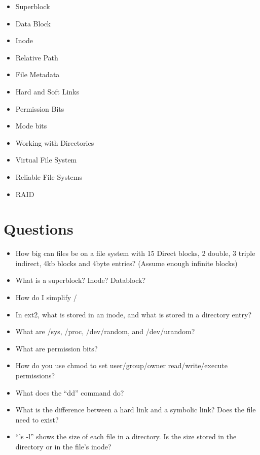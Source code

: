 \begin{itemize}
\tightlist
\item
  Superblock
\item
  Data Block
\item
  Inode
\item
  Relative Path
\item
  File Metadata
\item
  Hard and Soft Links
\item
  Permission Bits
\item
  Mode bits
\item
  Working with Directories
\item
  Virtual File System
\item
  Reliable File Systems
\item
  RAID
\end{itemize}

\section{Questions}\label{questions}

\begin{itemize}
\tightlist
\item
  How big can files be on a file system with 15 Direct blocks, 2 double, 3 triple indirect, 4kb blocks and 4byte entries? (Assume enough infinite blocks)
\item
  What is a superblock? Inode? Datablock?
\item
  How do I simplify /
\item
  In ext2, what is stored in an inode, and what is stored in a directory entry?
\item
  What are /sys, /proc, /dev/random, and /dev/urandom?
\item
  What are permission bits?
\item
  How do you use chmod to set user/group/owner read/write/execute permissions?
\item
  What does the ``dd'' command do?
\item
  What is the difference between a hard link and a symbolic link? Does the file need to exist?
\item
  ``ls -l'' shows the size of each file in a directory. Is the size stored in the directory or in the file's inode?
\end{itemize}



